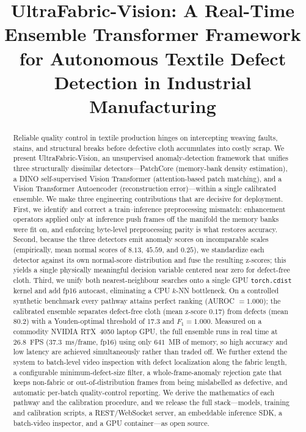 \documentclass[journal]{IEEEtran}
\begin{document}
\title{UltraFabric-Vision: A Real-Time Ensemble Transformer Framework for Autonomous Textile Defect Detection in Industrial Manufacturing}

\author{
}

\maketitle

\begin{abstract}
Reliable quality control in textile production hinges on intercepting weaving faults, stains, and structural breaks before defective cloth accumulates into costly scrap. We present UltraFabric-Vision, an unsupervised anomaly-detection framework that unifies three structurally dissimilar detectors---PatchCore (memory-bank density estimation), a DINO self-supervised Vision Transformer (attention-based patch matching), and a Vision Transformer Autoencoder (reconstruction error)---within a single calibrated ensemble. We make three engineering contributions that are decisive for deployment. First, we identify and correct a train--inference preprocessing mismatch: enhancement operators applied only at inference push frames off the manifold the memory banks were fit on, and enforcing byte-level preprocessing parity is what restores accuracy. Second, because the three detectors emit anomaly scores on incomparable scales (empirically, mean normal scores of $8.13$, $45.59$, and $0.25$), we standardize each detector against its own normal-score distribution and fuse the resulting z-scores; this yields a single physically meaningful decision variable centered near zero for defect-free cloth. Third, we unify both nearest-neighbour searches onto a single GPU \texttt{torch.cdist} kernel and add fp16 autocast, eliminating a CPU $k$-NN bottleneck. On a controlled synthetic benchmark every pathway attains perfect ranking (AUROC $=1.000$); the calibrated ensemble separates defect-free cloth (mean z-score $0.17$) from defects (mean $80.2$) with a Youden-optimal threshold of $17.3$ and $F_1 = 1.000$. Measured on a commodity NVIDIA RTX~4050 laptop GPU, the full ensemble runs in real time at $26.8$~FPS ($37.3$~ms/frame, fp16) using only $641$~MB of memory, so high accuracy and low latency are achieved simultaneously rather than traded off. We further extend the system to batch-level video inspection with defect localization along the fabric length, a configurable minimum-defect-size filter, a whole-frame-anomaly rejection gate that keeps non-fabric or out-of-distribution frames from being mislabelled as defective, and automatic per-batch quality-control reporting. We derive the mathematics of each pathway and the calibration procedure, and we release the full stack---models, training and calibration scripts, a REST/WebSocket server, an embeddable inference SDK, a batch-video inspector, and a GPU container---as open source.
\end{abstract}
\end{document}
